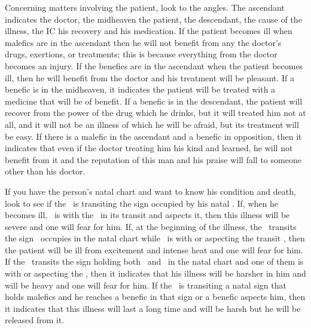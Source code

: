 Concerning matters involving the patient, look to the angles. The ascendant indicates the doctor, the midheaven the patient, the descendant, the cause of the illness, the IC his recovery and his medication. If the patient becomes ill when malefics are in the ascendant then he will not benefit from any the doctor's drugs, exertions, or treatments; this is because everything from the doctor becomes an injury. If the benefics are in the ascendant when the patient becomes ill, then he will benefit from the doctor and his treatment will be pleasant.  If a benefic is in the midheaven, it indicates the patient will be treated with a medicine that will be of benefit. If a benefic is in the descendant, the patient will recover from the power of the drug which he drinks, but it will treated him not at all, and it will not be an illness of which he will be afraid, but its treatment will be easy. If there is a malefic in the ascendant and a benefic in opposition, then it indicates that even if the doctor treating him his kind and learned, he will not benefit from it and the reputation of this man and his praise will fall to someone other than his doctor.

If you have the person's natal chart and want to know his condition and death, look to see if the \Moon\, is transiting the sign occupied by his natal \Saturn. If, when he becomes ill, \Saturn\, is with the \Moon\, in its transit and aspects it, then this illness will be severe and one will fear for him. If, at the beginning of the illness, the \Moon\, transits the sign \Mars\, occupies in the natal chart while \Mars\, is with or aspecting the transit \Moon, then the patient will be ill from excitement and intense heat and one will fear for him. If the \Moon\, transits the sign holding both \Saturn\, and \Mars\, in the natal chart and one of them is with or aspecting the \Moon, then it indicates that his illness will be harsher in him and will be heavy and one will fear for him. If the \Moon\, is transiting a natal sign that holds malefics and he reaches a benefic in that sign or a benefic aspects him, then it indicates that this illness will last a long time and will be harsh but he will be released from it. 







